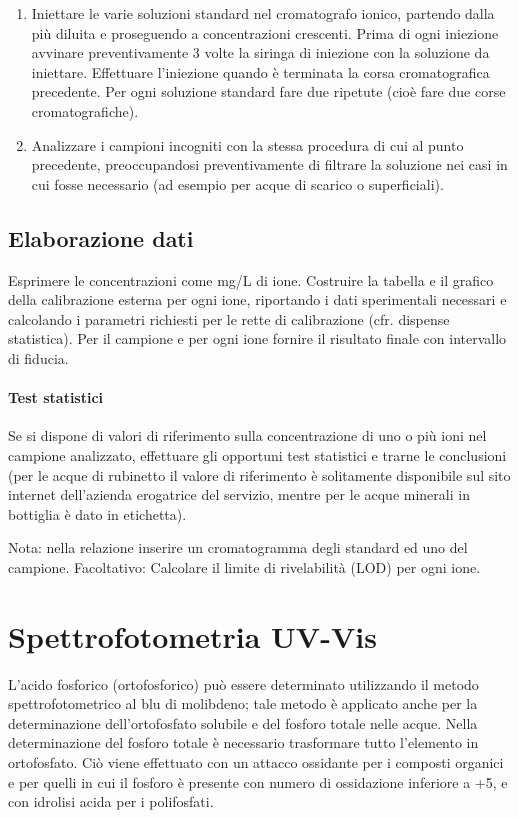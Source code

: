 \begin{enumerate}
\item Iniettare le varie soluzioni standard nel cromatografo ionico, partendo dalla più diluita e proseguendo a concentrazioni crescenti. Prima di ogni iniezione avvinare preventivamente 3 volte la siringa di iniezione con la soluzione da iniettare. Effettuare l'iniezione quando è terminata la corsa cromatografica precedente. Per ogni soluzione standard fare due ripetute (cioè fare due corse cromatografiche).
\item Analizzare i campioni incogniti con la stessa procedura di cui al punto precedente, preoccupandosi preventivamente di filtrare la soluzione nei casi in cui fosse necessario (ad esempio per acque di scarico o superficiali).
\end{enumerate}

\subsection{Elaborazione dati}

Esprimere le concentrazioni come mg/L di ione. Costruire la tabella e il grafico della calibrazione esterna per ogni ione, riportando i dati sperimentali necessari e calcolando i parametri richiesti per le rette di calibrazione (cfr. dispense statistica). Per il campione e per ogni ione fornire il risultato finale con intervallo di fiducia.

\paragraph{Test statistici}
Se si dispone di valori di riferimento sulla concentrazione di uno o più ioni nel campione analizzato, effettuare gli opportuni test statistici e trarne le conclusioni (per le acque di rubinetto il valore di riferimento è solitamente disponibile sul sito internet dell'azienda erogatrice del servizio, mentre per le acque minerali in bottiglia è dato in etichetta).

Nota: nella relazione inserire un cromatogramma degli standard ed uno del campione.
Facoltativo: Calcolare il limite di rivelabilità (LOD) per ogni ione.

\section{Spettrofotometria UV-Vis}

L'acido fosforico (ortofosforico) può essere determinato utilizzando il metodo spettrofotometrico al blu di molibdeno; tale metodo è applicato anche per la determinazione dell'ortofosfato solubile e del fosforo totale nelle acque. Nella determinazione del fosforo totale è necessario trasformare tutto l'elemento in ortofosfato. Ciò viene effettuato con un attacco ossidante per i composti organici e per quelli in cui il fosforo è presente con numero di ossidazione inferiore a +5, e con idrolisi acida per i polifosfati.

